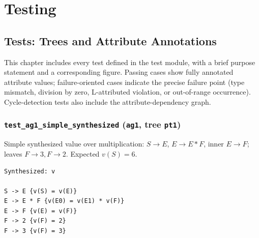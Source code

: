 
%

\chapter{Testing}
\label{cha:Testing}

\section{Tests: Trees and Attribute Annotations}
This chapter includes every test defined in the test module, with a brief purpose statement and a corresponding figure. 
Passing cases show fully annotated attribute values; failure-oriented cases indicate the precise failure point (type mismatch, division by zero, L-attributed 
violation, or out-of-range occurrence). Cycle-detection tests also include the attribute-dependency graph. 

\subsection{\texttt{test\_ag1\_simple\_synthesized} (\texttt{ag1}, tree \texttt{pt1})}
Simple synthesized value over multiplication: \(S\to E\), \(E\to E * F\), inner \(E\to F\); leaves \(F\to 3, F\to 2\). Expected \(v(S)=6\). 

\begin{verbatim}
Synthesized: v

S -> E {v(S) = v(E)}
E -> E * F {v(E0) = v(E1) * v(F)}
E -> F {v(E) = v(F)}
F -> 2 {v(F) = 2}
F -> 3 {v(F) = 3}

\end{verbatim}


